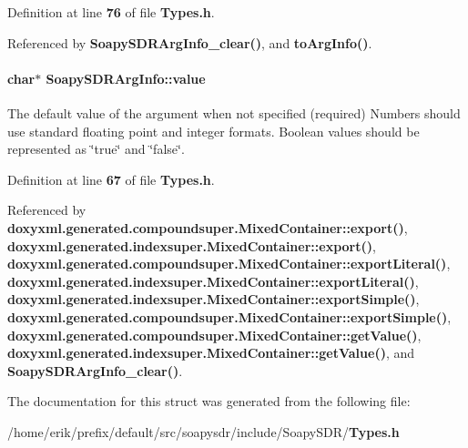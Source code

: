 Definition at line {\bf 76} of file {\bf Types.\+h}.



Referenced by {\bf Soapy\+S\+D\+R\+Arg\+Info\+\_\+clear()}, and {\bf to\+Arg\+Info()}.

\paragraph[{value}]{\setlength{\rightskip}{0pt plus 5cm}char$\ast$ Soapy\+S\+D\+R\+Arg\+Info\+::value}\label{structSoapySDRArgInfo_accef107af453fbec00225047da3ee853}
The default value of the argument when not specified (required) Numbers should use standard floating point and integer formats. Boolean values should be represented as \char`\"{}true\char`\"{} and \char`\"{}false\char`\"{}. 

Definition at line {\bf 67} of file {\bf Types.\+h}.



Referenced by {\bf doxyxml.\+generated.\+compoundsuper.\+Mixed\+Container\+::export()}, {\bf doxyxml.\+generated.\+indexsuper.\+Mixed\+Container\+::export()}, {\bf doxyxml.\+generated.\+compoundsuper.\+Mixed\+Container\+::export\+Literal()}, {\bf doxyxml.\+generated.\+indexsuper.\+Mixed\+Container\+::export\+Literal()}, {\bf doxyxml.\+generated.\+indexsuper.\+Mixed\+Container\+::export\+Simple()}, {\bf doxyxml.\+generated.\+compoundsuper.\+Mixed\+Container\+::export\+Simple()}, {\bf doxyxml.\+generated.\+compoundsuper.\+Mixed\+Container\+::get\+Value()}, {\bf doxyxml.\+generated.\+indexsuper.\+Mixed\+Container\+::get\+Value()}, and {\bf Soapy\+S\+D\+R\+Arg\+Info\+\_\+clear()}.



The documentation for this struct was generated from the following file\+:\begin{DoxyCompactItemize}
\item 
/home/erik/prefix/default/src/soapysdr/include/\+Soapy\+S\+D\+R/{\bf Types.\+h}\end{DoxyCompactItemize}
